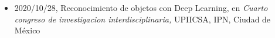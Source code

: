 \begin{itemize} 
\item 2020/10/28, Reconocimiento de objetos con Deep Learning, en \textit{ Cuarto congreso de investigacion interdisciplinaria,} UPIICSA, IPN, Ciudad de México 
\end{itemize} 
